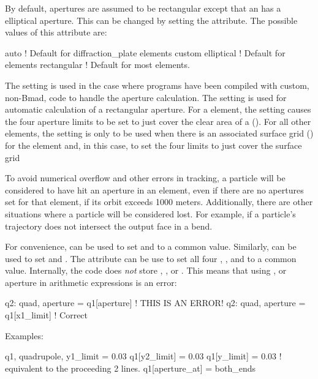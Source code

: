 By default, apertures are assumed to be rectangular except that an
 has a elliptical aperture. This can be changed by
setting the  attribute. The possible values of this
attribute are:
\begin{example}
  auto         ! Default for diffraction_plate elements
  custom
  elliptical   ! Default for  elements
  rectangular  ! Default for most elements.
\end{example}
The  setting is used in the case where programs have been
compiled with custom, non-Bmad, code to handle the aperture
calculation.  The  setting is used for automatic calculation
of a rectangular aperture. For a  element, the
 setting causes the four aperture limits to be set to just
cover the clear area of a 
(). For all other elements, the 
setting is only to be used when there is an associated surface grid
() for the element and, in this case, \bmad to set
the four limits to just cover the surface grid

To avoid numerical overflow and other errors in tracking, a particle
will be considered to have hit an aperture in an element, even if
there are no apertures set for that element, if its orbit exceeds 1000
meters. Additionally, there are other situations where a particle will
be considered lost. For example, if a particle's trajectory does
not intersect the output face in a bend.

For convenience,  can be used to set  and
 to a common value. Similarly,  can be used
to set  and .  The  attribute
can be use to set all four , , 
and  to a common value. Internally, the \bmad code does {\em not}
store , , or . This means that
using ,  or aperture in arithmetic expressions is
an error:
\begin{example}
  q2: quad, aperture = q1[aperture]   ! THIS IS AN ERROR!
  q2: quad, aperture = q1[x1_limit]   ! Correct
\end{example}

Examples:
\begin{example}
  q1, quadrupole, y1_limit = 0.03
  q1[y2_limit] = 0.03
  q1[y_limit] = 0.03  ! equivalent to the proceeding 2 lines.  
  q1[aperture_at] = both_ends
\end{example}

